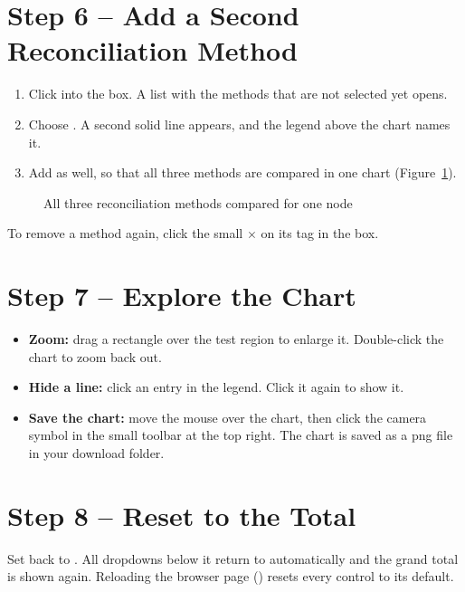 \section{Step 6 -- Add a Second Reconciliation Method}
\label{sec:fsRec}

\begin{enumerate}
  \item Click into the  box. A list with the methods that are not selected yet opens.
  \item Choose . A second solid line appears, and the legend above the chart names it.
  \item Add  as well, so that all three methods are compared in one chart (Figure~\ref{fig:fsRec}).
\end{enumerate}

\begin{figure}[H]
  \centering
  \caption{All three reconciliation methods compared for one node}
  \label{fig:fsRec}
\end{figure}

To remove a method again, click the small $\times$ on its tag in the box.

\section{Step 7 -- Explore the Chart}
\label{sec:fsExplore}

\begin{itemize}
  \item \textbf{Zoom:} drag a rectangle over the test region to enlarge it. Double-click the chart to zoom back out.
  \item \textbf{Hide a line:} click an entry in the legend. Click it again to show it.
  \item \textbf{Save the chart:} move the mouse over the chart, then click the camera symbol in the small toolbar at the top right. The chart is saved as a \ac{png} file in your download folder.
\end{itemize}

\section{Step 8 -- Reset to the Total}
\label{sec:fsReset}

Set  back to . All dropdowns below it return to  automatically and the grand total is shown again. Reloading the browser page () resets every control to its default.

